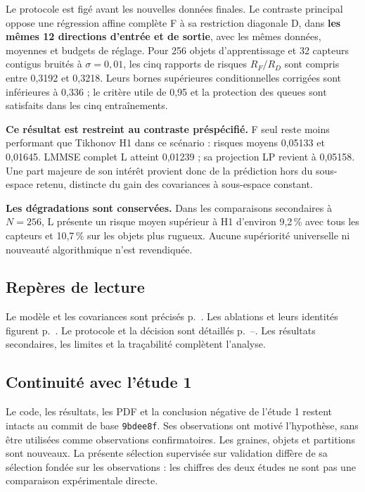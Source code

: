 \documentclass[11pt,a4paper]{article}
\begin{document}
Le protocole est figé avant les nouvelles données finales. Le contraste principal oppose une régression affine complète F à sa restriction diagonale D, dans \textbf{les mêmes 12 directions d'entrée et de sortie}, avec les mêmes données, moyennes et budgets de réglage. Pour 256 objets d'apprentissage et 32 capteurs contigus bruités à $\sigma=0,01$, les cinq rapports de risques $R_F/R_D$ sont compris entre 0,3192 et 0,3218. Leurs bornes supérieures conditionnelles corrigées sont inférieures à 0,336 ; le critère utile de 0,95 et la protection des queues sont satisfaits dans les cinq entraînements.

\textbf{Ce résultat est restreint au contraste préspécifié.} F seul reste moins performant que Tikhonov H1 dans ce scénario : risques moyens 0,05133 et 0,01645. LMMSE complet L atteint 0,01239 ; sa projection LP revient à 0,05158. Une part majeure de son intérêt provient donc de la prédiction hors du sous-espace retenu, distincte du gain des covariances à sous-espace constant.

\textbf{Les dégradations sont conservées.} Dans les comparaisons secondaires à $N=256$, L présente un risque moyen supérieur à H1 d'environ 9,2\,\% avec tous les capteurs et 10,7\,\% sur les objets plus rugueux. Aucune supériorité universelle ni nouveauté algorithmique n'est revendiquée.

\subsection*{Repères de lecture}
Le modèle et les covariances sont précisés p.~\pageref{model}. Les ablations et leurs identités figurent p.~\pageref{ablations}. Le protocole et la décision sont détaillés p.~\pageref{protocol}--\pageref{primary}. Les résultats secondaires, les limites et la traçabilité complètent l'analyse.

\subsection*{Continuité avec l'étude 1}
Le code, les résultats, les PDF et la conclusion négative de l'étude 1 restent intacts au commit de base \texttt{9bdee8f}. Ses observations ont motivé l'hypothèse, sans être utilisées comme observations confirmatoires. Les graines, objets et partitions sont nouveaux. La présente sélection supervisée sur validation diffère de sa sélection fondée sur les observations : les chiffres des deux études ne sont pas une comparaison expérimentale directe.
\end{document}
